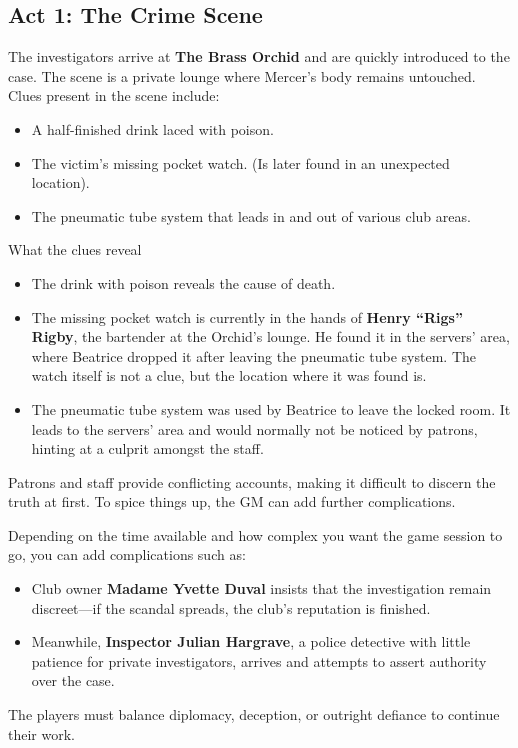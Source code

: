 \subsection{Act 1: The Crime Scene}
The investigators arrive at \textbf{The Brass Orchid} and are quickly introduced to the case. The scene is a private lounge where Mercer’s body remains untouched. Clues present in the scene include:
\begin{WyrdExplanation}
	\begin{itemize}
		\item A half-finished drink laced with poison.
		\item The victim’s missing pocket watch. (Is later found in an unexpected location).
		\item The pneumatic tube system that leads in and out of various club areas.
	\end{itemize}
\end{WyrdExplanation}

\begin{WyrdComment}{What the clues reveal}
	\begin{itemize}
		\item The drink with poison reveals the cause of death.
		\item The missing pocket watch is currently in the hands of \textbf{Henry ``Rigs'' Rigby}, the bartender at the Orchid's lounge. He found it in the servers' area, where Beatrice dropped it after leaving the pneumatic tube system. The watch itself is not a clue, but the location where it was found is.
		\item The pneumatic tube system was used by Beatrice to leave the locked room. It leads to the servers' area and would normally not be noticed by patrons, hinting at a culprit amongst the staff.
	\end{itemize}
\end{WyrdComment}


Patrons and staff provide conflicting accounts, making it difficult to discern the truth at first. To spice things up, the GM can add further complications.

\begin{WyrdExplanation}[Complications]
	Depending on the time available and how complex you want the game session to go, you can add complications such as:
	\begin{itemize}
		\item Club owner \textbf{Madame Yvette Duval} insists that the investigation remain discreet—if the scandal spreads, the club’s reputation is finished. 
		\item Meanwhile, \textbf{Inspector Julian Hargrave}, a police detective with little patience for private investigators, arrives and attempts to assert authority over the case.
	\end{itemize}
	
	\noindent
	The players must balance diplomacy, deception, or outright defiance to continue their work.
\end{WyrdExplanation}

